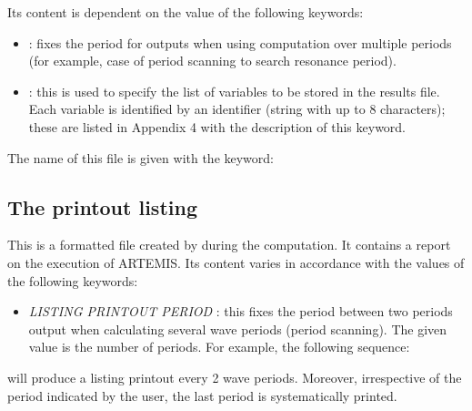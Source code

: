 Its content is dependent on the value of the following keywords:

\begin{itemize}
\item  {}: fixes the period for outputs when
  using computation over multiple periods (for example, case of period scanning
    to search resonance period).

\item  {} : this is used to specify the
  list of variables to be stored in the results file. Each variable is
    identified by an identifier (string with up to 8 characters); these are
    listed in Appendix 4 with the description of this keyword.
\end{itemize}

The name of this file is given with the keyword: 


\subsection{The printout listing}\label{listing}

This is a formatted file created by \artemis{} during the computation. It
contains a report on the execution of ARTEMIS\@. Its content varies in
accordance with the values of the following keywords:

\begin{itemize}
\item  \textit{LISTING PRINTOUT PERIOD} : this fixes the period between two
  periods output when calculating several wave periods (period scanning). The
    given value is the number of periods. For example, the following sequence:
\end{itemize}


will produce a listing printout every 2 wave periods. Moreover, irrespective of
the period indicated by the user, the last period is systematically printed.

